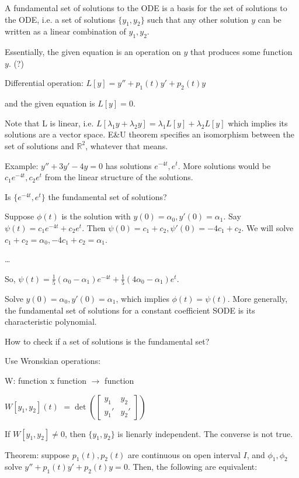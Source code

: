 \documentclass{article}
\newcommand{\R}{\mathbb{R}}
\begin{document}
A fundamental set of solutions to the ODE is a basis for the set of solutions to the ODE, i.e. a set of solutions $\{y_1, y_2\}$ such that any other solution $y$ can be written as a linear combination of $y_1, y_2$.

Essentially, the given equation is an operation on $y$ that produces some function $y$. (?)

Differential operation:
$L[y] = y'' + p_1(t)y' + p_2(t)y$

and the given equation is $L[y] = 0$.

Note that L is linear, i.e. $L[\lambda_1y+\lambda_2y]=\lambda_1L[y] + \lambda_2L[y]$ which implies its solutions are a vector space. E\&U theorem specifies an isomorphism between the set of solutions and $\R^2$, whatever that means.

Example:
$y'' + 3y'-4y=0$ has solutions $e^{-4t}, e^{t}$. More solutions would be $c_1e^{-4t},c_2e^t$ from the linear structure of the solutions.

Is $\{e^{-4t}, e^t\}$ the fundamental set of solutions?

Suppose $\phi(t)$ is the solution with $y(0) = \alpha_0, y'(0) = \alpha_1$. Say $\psi(t) = c_1e^{-4t} + c_2e^t$. Then $\psi(0)=c_1 + c_2, \psi'(0) = -4c_1 + c_2$. We will solve $c_1 + c_2 = \alpha_0, -4c_1 + c_2 = \alpha_1$.

\dots

So, $\psi(t) = \frac{1}{5}(\alpha_0 - \alpha_1) e^{-4t} + \frac{1}{5}(4\alpha_0 - \alpha_1)e^t$.

Solve $y(0)=\alpha_0, y'(0)=\alpha_1$, which implies $\phi(t)=\psi(t)$. More generally, the fundamental set of solutions for a constant coefficient SODE is its characteristic polynomial.

How to check if a set of solutions is the fundamental set?

Use Wronskian operations:

W: function x function $\to$ function

$W[y_1, y_2](t)$
$=\det(\begin{bmatrix} y_1 & y_2 \\ y_1' & y_2' \end{bmatrix})$

If $W[y_1,y_2] \neq 0$, then $\{y_1, y_2\}$ is lienarly independent. The converse is not true.

Theorem: suppose $p_1(t),p_2(t)$ are continuous on open interval $I$, and $\phi_1, \phi_2$ solve $y'' + p_1(t)y' + p_2(t)y = 0$. Then, the following are equivalent:
\end{document}

